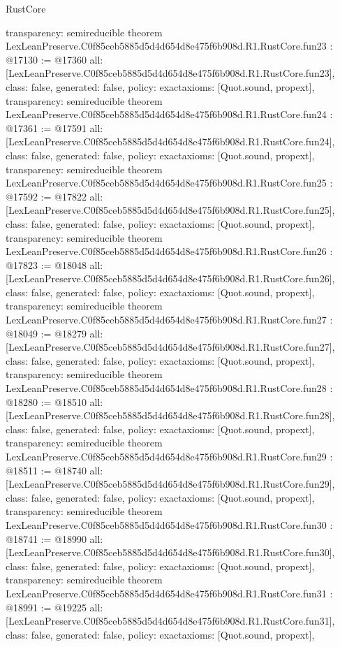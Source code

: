 \begin{lexlean}{RustCore}
\begin{coremodule}
{  transparency: semireducible
}
theorem LexLeanPreserve.C0f85ceb5885d5d4d654d8e475f6b908d.R1.RustCore.fun23 : @17130 := @17360 {
  all: [LexLeanPreserve.C0f85ceb5885d5d4d654d8e475f6b908d.R1.RustCore.fun23],
  class: false,
  generated: false,
  policy: exact{axioms: [Quot.sound, propext]},
  transparency: semireducible
}
theorem LexLeanPreserve.C0f85ceb5885d5d4d654d8e475f6b908d.R1.RustCore.fun24 : @17361 := @17591 {
  all: [LexLeanPreserve.C0f85ceb5885d5d4d654d8e475f6b908d.R1.RustCore.fun24],
  class: false,
  generated: false,
  policy: exact{axioms: [Quot.sound, propext]},
  transparency: semireducible
}
theorem LexLeanPreserve.C0f85ceb5885d5d4d654d8e475f6b908d.R1.RustCore.fun25 : @17592 := @17822 {
  all: [LexLeanPreserve.C0f85ceb5885d5d4d654d8e475f6b908d.R1.RustCore.fun25],
  class: false,
  generated: false,
  policy: exact{axioms: [Quot.sound, propext]},
  transparency: semireducible
}
theorem LexLeanPreserve.C0f85ceb5885d5d4d654d8e475f6b908d.R1.RustCore.fun26 : @17823 := @18048 {
  all: [LexLeanPreserve.C0f85ceb5885d5d4d654d8e475f6b908d.R1.RustCore.fun26],
  class: false,
  generated: false,
  policy: exact{axioms: [Quot.sound, propext]},
  transparency: semireducible
}
theorem LexLeanPreserve.C0f85ceb5885d5d4d654d8e475f6b908d.R1.RustCore.fun27 : @18049 := @18279 {
  all: [LexLeanPreserve.C0f85ceb5885d5d4d654d8e475f6b908d.R1.RustCore.fun27],
  class: false,
  generated: false,
  policy: exact{axioms: [Quot.sound, propext]},
  transparency: semireducible
}
theorem LexLeanPreserve.C0f85ceb5885d5d4d654d8e475f6b908d.R1.RustCore.fun28 : @18280 := @18510 {
  all: [LexLeanPreserve.C0f85ceb5885d5d4d654d8e475f6b908d.R1.RustCore.fun28],
  class: false,
  generated: false,
  policy: exact{axioms: [Quot.sound, propext]},
  transparency: semireducible
}
theorem LexLeanPreserve.C0f85ceb5885d5d4d654d8e475f6b908d.R1.RustCore.fun29 : @18511 := @18740 {
  all: [LexLeanPreserve.C0f85ceb5885d5d4d654d8e475f6b908d.R1.RustCore.fun29],
  class: false,
  generated: false,
  policy: exact{axioms: [Quot.sound, propext]},
  transparency: semireducible
}
theorem LexLeanPreserve.C0f85ceb5885d5d4d654d8e475f6b908d.R1.RustCore.fun30 : @18741 := @18990 {
  all: [LexLeanPreserve.C0f85ceb5885d5d4d654d8e475f6b908d.R1.RustCore.fun30],
  class: false,
  generated: false,
  policy: exact{axioms: [Quot.sound, propext]},
  transparency: semireducible
}
theorem LexLeanPreserve.C0f85ceb5885d5d4d654d8e475f6b908d.R1.RustCore.fun31 : @18991 := @19225 {
  all: [LexLeanPreserve.C0f85ceb5885d5d4d654d8e475f6b908d.R1.RustCore.fun31],
  class: false,
  generated: false,
  policy: exact{axioms: [Quot.sound, propext]},
}
\end{coremodule}
\end{lexlean}
